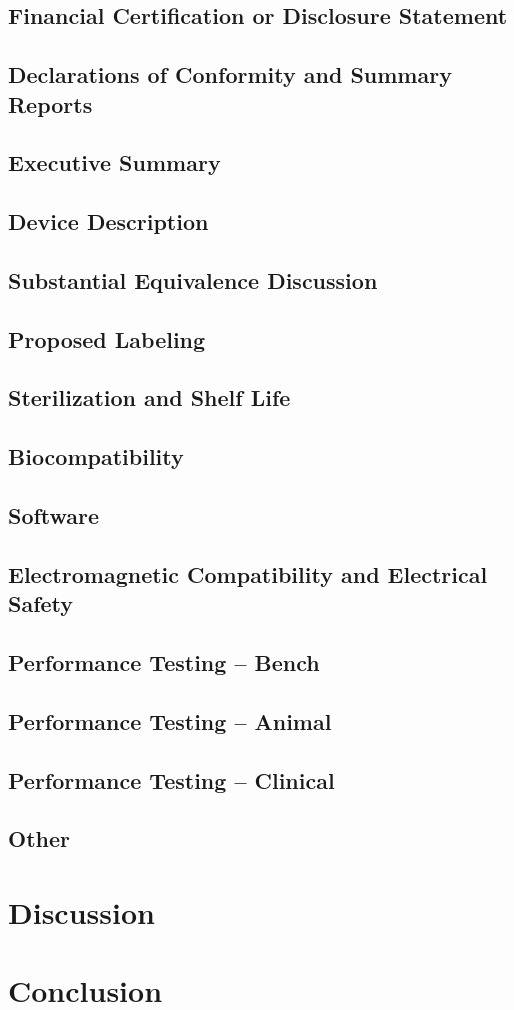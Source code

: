 \documentclass{article}
\begin{document}
\subsection{Financial Certification or Disclosure Statement}
\subsection{Declarations of Conformity and Summary Reports}
\subsection{Executive Summary}
\subsection{Device Description}
\subsection{Substantial Equivalence Discussion}
\subsection{Proposed Labeling}
\subsection{Sterilization and Shelf Life}
\subsection{Biocompatibility}
\subsection{Software}
\subsection{Electromagnetic Compatibility and Electrical Safety}
\subsection{Performance Testing – Bench}
\subsection{Performance Testing – Animal}
\subsection{Performance Testing – Clinical}
\subsection{Other}

\section{Discussion}
\label{sec:discussion}

\section{Conclusion}
\label{sec:conclusion}


\newpage
{}


\end{document}
